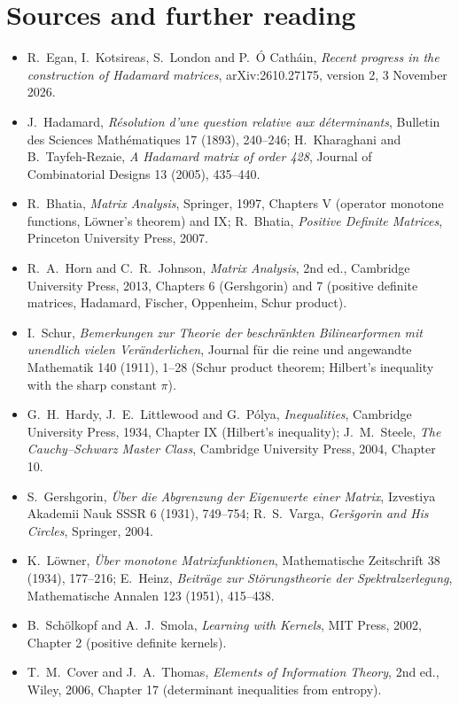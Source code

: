 \section*{Sources and further reading}

\begin{itemize}
\item R.~Egan, I.~Kotsireas, S.~London and P.~\'O Cath\'ain, \emph{Recent progress in the construction of Hadamard matrices}, arXiv:2610.27175, version 2, 3 November 2026.
\item J.~Hadamard, \emph{R\'esolution d'une question relative aux d\'eterminants}, Bulletin des Sciences Math\'ematiques 17 (1893),
240--246; H.~Kharaghani and B.~Tayfeh-Rezaie, \emph{A Hadamard matrix of order 428}, Journal of Combinatorial Designs 13 (2005), 435--440.
\item R.~Bhatia, \emph{Matrix Analysis}, Springer, 1997, Chapters V (operator monotone functions, L\"owner's theorem) and IX; R.~Bhatia,
\emph{Positive Definite Matrices}, Princeton University Press, 2007.
\item R.~A.~Horn and C.~R.~Johnson, \emph{Matrix Analysis}, 2nd ed., Cambridge University Press, 2013, Chapters 6 (Gershgorin) and 7
(positive definite matrices, Hadamard, Fischer, Oppenheim, Schur product).
\item I.~Schur, \emph{Bemerkungen zur Theorie der beschr\"ankten Bilinearformen mit unendlich vielen Ver\"anderlichen}, Journal f\"ur die
reine und angewandte Mathematik 140 (1911), 1--28 (Schur product theorem; Hilbert's inequality with the sharp constant $\pi$).
\item G.~H.~Hardy, J.~E.~Littlewood and G.~P\'olya, \emph{Inequalities}, Cambridge University Press, 1934, Chapter IX (Hilbert's inequality);
J.~M.~Steele, \emph{The Cauchy--Schwarz Master Class}, Cambridge University Press, 2004, Chapter 10.
\item S.~Gershgorin, \emph{\"Uber die Abgrenzung der Eigenwerte einer Matrix}, Izvestiya Akademii Nauk SSSR 6 (1931), 749--754; R.~S.~Varga,
\emph{Ger\v{s}gorin and His Circles}, Springer, 2004.
\item K.~L\"owner, \emph{\"Uber monotone Matrixfunktionen}, Mathematische Zeitschrift 38 (1934), 177--216; E.~Heinz, \emph{Beitr\"age zur
St\"orungstheorie der Spektralzerlegung}, Mathematische Annalen 123 (1951), 415--438.
\item B.~Sch\"olkopf and A.~J.~Smola, \emph{Learning with Kernels}, MIT Press, 2002, Chapter 2 (positive definite kernels).
\item T.~M.~Cover and J.~A.~Thomas, \emph{Elements of Information Theory}, 2nd ed., Wiley, 2006, Chapter 17 (determinant inequalities
from entropy).
\end{itemize}
